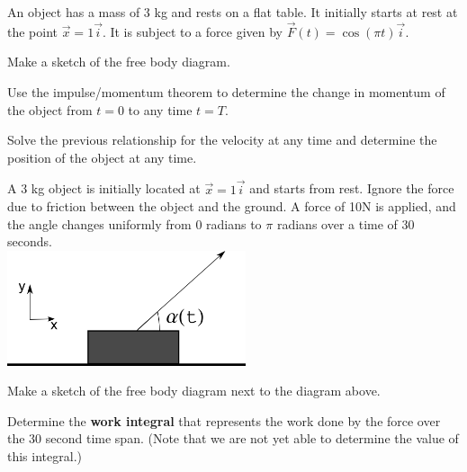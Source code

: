 \begin{problem}
\item An object has a mass of 3 kg and rests on a flat table. It
  initially starts at rest at the point $\vec{x}=1\vec{i}$. It is
  subject to a force given by $\vec{F}(t) = \cos(\pi t) \vec{i}$.
  \begin{subproblem}
    \item Make a sketch of the free body diagram.
      \vspace{5em}
    \item Use the impulse/momentum theorem to determine the change in
      momentum of the object from $t=0$ to any time $t=T$.
      \vfill
    \item Solve the previous relationship for the velocity at any time
      and determine the position of the object at any time.
      \vfill
  \end{subproblem}

  \clearpage

\item A 3 kg object is initially located at $\vec{x}=1\vec{i}$ and
  starts from rest. Ignore the force due to friction between the
  object and the ground. A force of 10N is applied, and the angle
  changes uniformly from 0 radians to $\pi$ radians over a time of
  30 seconds.\\
  \includegraphics[width=7cm]{ink/week9/workAngleChanging}
  \begin{subproblem}
    \item Make a sketch of the free body diagram next to the diagram above.
    \item Determine the \textbf{work integral} that represents the
      work done by the force over the 30 second time span.  (Note that
      we are not yet able to determine the value of this integral.)

      \vfill

  \end{subproblem}
\end{problem}

